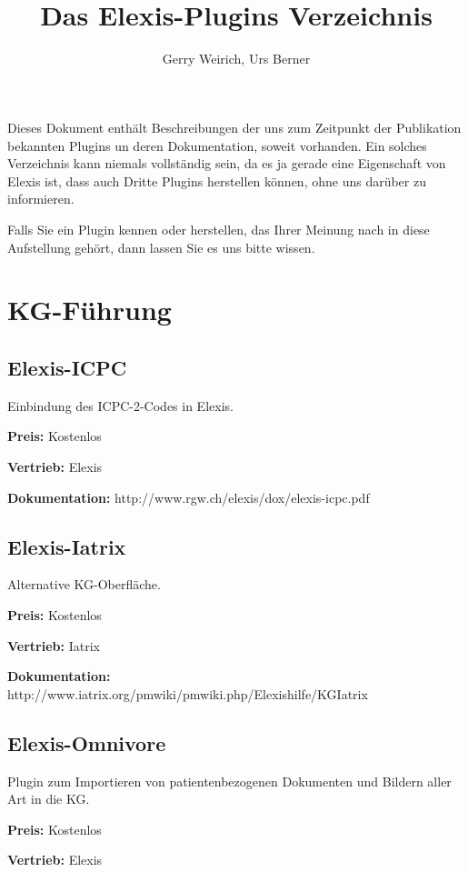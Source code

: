 \documentclass[paper=a4,BCOR8.25mm]{scrartcl}
\author{Gerry Weirich, Urs Berner}
\title{Das Elexis\textsuperscript{\textregistered}-Plugins Verzeichnis}
\begin{document}
\maketitle

\tableofcontents


Dieses Dokument enthält Beschreibungen der uns zum Zeitpunkt der Publikation bekannten Plugins un deren Dokumentation, soweit vorhanden. Ein solches Verzeichnis kann niemals vollständig sein, da es ja gerade eine Eigenschaft von Elexis ist, dass auch Dritte Plugins herstellen können, ohne uns darüber zu informieren.

\medskip

Falls Sie ein Plugin kennen oder herstellen, das Ihrer Meinung nach in diese Aufstellung gehört, dann lassen Sie es uns bitte wissen.



\section{KG-Führung}
\subsection{Elexis-ICPC}
Einbindung des ICPC-2-Codes in Elexis.

\medskip

\textbf{Preis:} Kostenlos

\textbf{Vertrieb:} Elexis

\textbf{Dokumentation:} http://www.rgw.ch/elexis/dox/elexis-icpc.pdf\

\subsection{Elexis-Iatrix}
Alternative KG-Oberfläche.

\textbf{Preis:} Kostenlos

\textbf{Vertrieb:} Iatrix

\textbf{Dokumentation:} http://www.iatrix.org/pmwiki/pmwiki.php/Elexishilfe/KGIatrix

\subsection{Elexis-Omnivore}
Plugin zum Importieren von patientenbezogenen Dokumenten und Bildern aller Art in die KG.

\textbf{Preis:} Kostenlos

\textbf{Vertrieb:} Elexis
\end{document}
